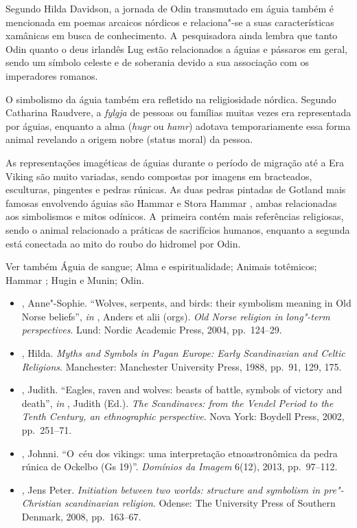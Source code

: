 Segundo Hilda Davidson, a jornada de Odin transmutado em águia também é
mencionada em poemas arcaicos nórdicos e relaciona"-se a suas
características xamânicas em busca de conhecimento. A~pesquisadora ainda
lembra que tanto Odin quanto o deus irlandês Lug estão relacionados a
águias e pássaros em geral, sendo um símbolo celeste e de soberania
devido a sua associação com os imperadores romanos.

O simbolismo da águia também era refletido na religiosidade nórdica.
Segundo Catharina Raudvere, a \emph{fylgja} de pessoas ou famílias
muitas vezes era representada por águias, enquanto a alma (\emph{hugr}
ou \emph{hamr}) adotava temporariamente essa forma animal revelando a
origem nobre (status moral) da pessoa.

As representações imagéticas de águias durante o período de migração até
a Era Viking são muito variadas, sendo compostas por imagens em
bracteados, esculturas, pingentes e pedras rúnicas. As duas pedras
pintadas de Gotland mais famosas envolvendo águias são Hammar  e Stora
Hammar , ambas relacionadas aos simbolismos e mitos odínicos. 
A~primeira contém mais referências religiosas, sendo o animal relacionado
a práticas de sacrifícios humanos, enquanto a segunda está conectada ao
mito do roubo do hidromel por Odin.

Ver também Águia de sangue; Alma e espiritualidade; Animais totêmicos;
Hammar ; Hugin e Munin; Odin.



\begin{itemize}\footnotesize
\item
  , Anne"-Sophie. ``Wolves, serpents, and birds: their symbolism
  meaning in Old Norse beliefs'', \emph{in}  , Anders et alii
  (orgs). \emph{Old Norse religion in long"-term perspectives}. Lund:
  Nordic Academic Press, 2004, pp.~124--29.
\item
  , Hilda. \emph{Myths and Symbols in Pagan Europe: Early
  Scandinavian and Celtic Religions}. Manchester: Manchester University
  Press, 1988, pp.~91, 129, 175.
\item
  , Judith. ``Eagles, raven and wolves: beasts of battle, symbols of
  victory and death'', \emph{in}  , Judith (Ed.). \emph{The Scandinaves:
  from the Vendel Period to the Tenth Century, an ethnographic
  perspective}. Nova York: Boydell Press, 2002, pp.~251--71.
\item
  , Johnni. ``O~céu dos vikings: uma interpretação etnoastronômica
  da pedra rúnica de Ockelbo (Gs 19)''. \emph{Domínios da Imagem} 6(12),
  2013, pp.~97--112.
\item
  , Jens Peter. \emph{Initiation between two worlds: structure
  and symbolism in pre"-Christian scandinavian religion}. Odense: The
  University Press of Southern Denmark, 2008, pp.~163--67.
\end{itemize}

